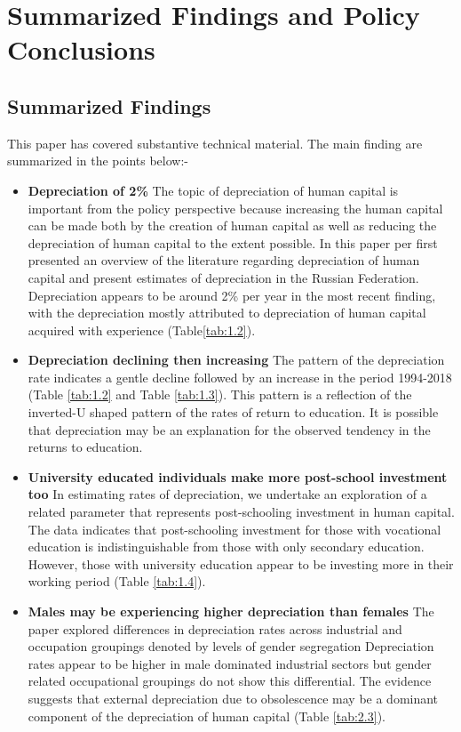 \documentclass[alpha-refs]{wiley-article-02b}
\begin{document}
\section{Summarized Findings and Policy Conclusions}


\subsection{Summarized Findings}

This paper has covered substantive technical material. The main finding are 
summarized in the points below:- 


\begin{itemize}

\item \textbf{Depreciation of 2\%} The topic of depreciation of 
human capital is important from the policy perspective because increasing 
the human capital can be made both by the creation of human capital as well 
as reducing the depreciation of human capital to the extent possible. In 
this paper per first presented an overview of the literature regarding 
depreciation of human capital and present estimates of depreciation in the 
Russian Federation. Depreciation appears to be around 2\% per year in the 
most recent finding, with the depreciation mostly attributed to 
depreciation of human capital acquired with experience (Table\ref{tab:1.2}).


\item \textbf{Depreciation declining then increasing}  The 
pattern of the depreciation rate indicates a gentle decline followed by an 
increase in the period 1994-2018 (Table \ref{tab:1.2} and Table 
\ref{tab:1.3}). This pattern is a reflection of the inverted-U shaped 
pattern of the rates of return to education. It is possible that 
depreciation may be an explanation for the observed tendency in the returns 
to education.


\item  \textbf{University educated individuals make more 
post-school investment too} In estimating rates of depreciation, we 
undertake an exploration of a related parameter that represents 
post-schooling investment in human capital. The data indicates that 
post-schooling investment for those with vocational education is 
indistinguishable from those with only secondary education. However, those 
with university education appear to be investing more in their working 
period (Table \ref{tab:1.4}).


\item  \textbf{Males may be experiencing higher depreciation 
than 
females} 
The paper explored differences in depreciation rates across industrial and 
occupation groupings denoted by levels of gender segregation Depreciation 
rates appear to be higher in male dominated industrial sectors but gender 
related occupational groupings do not show this differential. The evidence 
suggests that external depreciation due to obsolescence may be a dominant 
component of the depreciation of human capital (Table \ref{tab:2.3}). 



\end{itemize}
\end{document}
